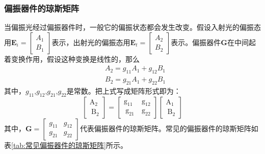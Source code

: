 \documentclass[type=master,oneside]{fduthesis}
\begin{document}
\subsubsection{偏振器件的琼斯矩阵}
当偏振光经过偏振器件时，一般它的偏振状态都会发生改变。假设入射光的偏振态用$\boldsymbol{E}_{i}=\left[\begin{array}{l}A_{1} \\ B_{1}\end{array}\right]$表示，出射光的偏振态用$\boldsymbol{E}_{t}=\left[\begin{array}{l}A_{2} \\ B_{2}\end{array}\right]$表示。偏振器件$\boldsymbol{G}$在中间起着变换作用，假设这种变换是线性的，那么
\begin{equation}
  \begin{aligned}
     & A_{2}=g_{11} A_{1}+g_{12} B_{1} \\
     & B_{2}=g_{21} A_{1}+g_{22} B_{1}
  \end{aligned}
\end{equation}
其中，$g_{11}$,$g_{12}$,$g_{21}$,$g_{22}$是常数。把上式写成矩阵形式即为：
\begin{equation}
  \left[\begin{array}{l}
      \mathrm{A}_{2} \\
      \mathrm{~B}_{2}
    \end{array}\right]=\left[\begin{array}{ll}
      \mathrm{g}_{11}  & \mathrm{~g}_{12} \\
      \mathrm{~g}_{21} & \mathrm{~g}_{22}
    \end{array}\right]\left[\begin{array}{l}
      \mathrm{A}_{1} \\
      \mathrm{~B}_{2}
    \end{array}\right]
\end{equation}
其中，$\boldsymbol{G}=\left[\begin{array}{ll}g_{11} & g_{12} \\ g_{21} & g_{22}\end{array}\right]$代表偏振器件的琼斯矩阵。常见的偏振器件的琼斯矩阵如表\ref{tab:常见偏振器件的琼斯矩阵}所示。
\end{document}
